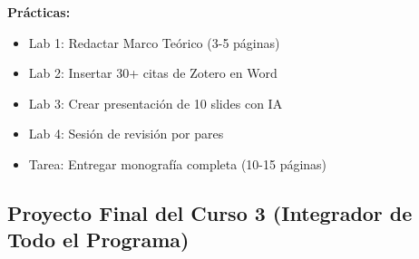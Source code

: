 \documentclass[12pt,a4paper]{yaac-luatex}
\begin{document}
\begin{tcolorbox}[
		enhanced,
		colback=white,
		colframe=curso3color,
		arc=3pt,
		boxrule=1.5pt,
		left=10pt,
		right=10pt,
		top=8pt,
		bottom=8pt,
		breakable
		]
		\textbf{Prácticas:}
		\begin{itemize}[leftmargin=*, itemsep=0.1cm]
			\item Lab 1: Redactar Marco Teórico (3-5 páginas)
			\item Lab 2: Insertar 30+ citas de Zotero en Word
			\item Lab 3: Crear presentación de 10 slides con IA
			\item Lab 4: Sesión de revisión por pares
			\item Tarea: Entregar monografía completa (10-15 páginas)
		\end{itemize}
	\end{tcolorbox}
	
	\vspace{0.5cm}
	
	\subsection*{Proyecto Final del Curso 3 (Integrador de Todo el Programa)}
	
\end{document}
